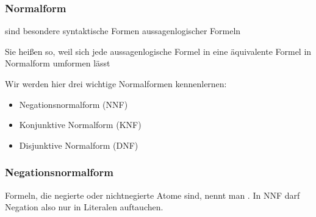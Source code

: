 \documentclass[aspectratio=1610,onlymath]{beamer}
\begin{document}
% 
% 
% 
% 
% 


\begin{frame}\frametitle{Normalform}

 sind besondere syntaktische Formen aussagenlogischer Formeln
\bigskip

Sie heißen so, weil sich jede aussagenlogische Formel in eine äquivalente Formel in Normalform umformen lässt
\bigskip

Wir werden hier drei wichtige Normalformen kennenlernen:
\begin{itemize}
\item \alert{Negationsnormalform} (NNF)
\item \alert{Konjunktive Normalform} (KNF)
\item \alert{Disjunktive Normalform} (DNF)
\end{itemize}

\end{frame}

\begin{frame}\frametitle{Negationsnormalform}

\medskip

Formeln, die negierte oder nichtnegierte Atome sind, nennt man .
In NNF darf Negation also nur in Literalen auftauchen.
\medskip\pause


\end{frame}
\end{document}
